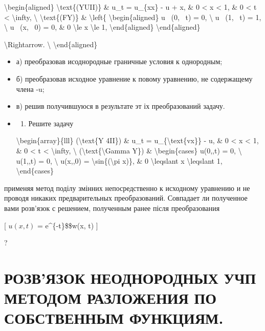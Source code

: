 \documentclass[
]{article}
\providecommand{\tightlist}{%
  \setlength{\itemsep}{0pt}\setlength{\parskip}{0pt}}
\begin{document}
{{\begin{enumerate}
  \textbackslash begin\{aligned\} \textbackslash text\{(YUII)\} \& u\_t
  = u\_\{xx\} - u + x, \& 0 \textless{} x \textless{} 1, \& 0
  \textless{} t \textless{} \textbackslash infty, \textbackslash{}
  \textbackslash text\{(FY)\} \& \textbackslash left\{
  \textbackslash begin\{aligned\} u ~(0, ~t) = 0, \textbackslash{} u
  ~(1, ~t) = 1, \textbackslash{} u ~(x, ~0) = 0, \& 0 \textbackslash le
  x \textbackslash le 1, \textbackslash end\{aligned\}
  \textbackslash end\{aligned\}

  \textbackslash Rightarrow. \textbackslash{}
  \textbackslash end\{aligned\}
\end{enumerate}

\begin{itemize}
\item
  а) преобразовав исоднородные граничные условия к однородным;
\item
  б) преобразовав исходное уравнение к повому уравнению, не содержащему
  члена -u;
\item
  в) решив получившуюся в результате эт іх преобразований задачу.
\item
  \begin{enumerate}
  \def\labelenumi{\arabic{enumi}.}
  \setcounter{enumi}{2}
  \tightlist
  \item
    Решите задачу
  \end{enumerate}

  \textbackslash begin\{array\}\{lll\} (\textbackslash text\{Y 4II\}) \&
  u\_t = u\_\{\textbackslash text\{vx\}\} - u, \& 0 \textless{} x
  \textless{} 1, \& 0 \textless{} t \textless{} \textbackslash infty,
  \textbackslash{} (\textbackslash text\{\textbackslash Gamma Y\}) \&
  \textbackslash begin\{cases\} u(0,,t) = 0, \textbackslash{} u(1,,t) =
  0, \textbackslash{} u(x,,0) = \textbackslash sin\{(\textbackslash pi
  x)\}, \& 0 \textbackslash leqslant x \textbackslash leqslant 1,
  \textbackslash end\{cases\}
\end{itemize}

применяя метод поділу змінних непосредственно к исходному уравнению и не
проводя никаких предварительных преобразований. Совпадает ли полученное
вами розв'язок с решением, полученным ранее після преобразования

{[} \(u(x, t)\) = e\^{}\{-t\}\$\$w(x, t) {]}

?

\section{РОЗВ'ЯЗОК НЕОДНОРОДНЫХ УЧП МЕТОДОМ РАЗЛОЖЕНИЯ ПО СОБСТВЕННЫМ
ФУНКЦИЯМ.}\label{ux440ux43eux437ux432ux44fux437ux43eux43a-ux43dux435ux43eux434ux43dux43eux440ux43eux434ux43dux44bux445-ux443ux447ux43f-ux43cux435ux442ux43eux434ux43eux43c-ux440ux430ux437ux43bux43eux436ux435ux43dux438ux44f-ux43fux43e-ux441ux43eux431ux441ux442ux432ux435ux43dux43dux44bux43c-ux444ux443ux43dux43aux446ux438ux44fux43c.}

}}
\end{document}
